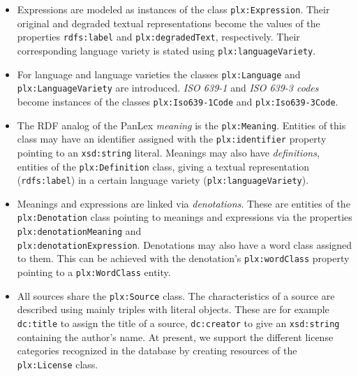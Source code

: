 \documentclass[sw]{iosart2c}
\begin{document}
\begin{itemize}
  \item Expressions are modeled as instances of the class \texttt{\small plx:Expression}.
    Their original and degraded textual representations become the values of the properties \texttt{\small rdfs:label} and \texttt{\small plx:degradedText}, respectively.
    Their corresponding language variety is stated using \texttt{\small plx:languageVariety}.
  \item For language and language varieties the classes \texttt{\small plx:Language} and \texttt{\small plx:LanguageVariety} are introduced.
    \emph{ISO 639-1} and \emph{ISO 639-3 codes} become instances of the classes \texttt{\small plx:Iso639-1Code} and \texttt{\small plx:Iso639-3Code}.
  \item The RDF analog of the PanLex \emph{meaning} is the \texttt{\small plx:Meaning}.
    Entities of this class may have an identifier assigned with the \texttt{\small plx:identifier} property pointing to an \texttt{\small xsd:string} literal.
    Meanings may also have \emph{definitions}, entities of the \texttt{\small plx:Definition} class, giving a textual representation (\texttt{\small rdfs:label}) in a certain language variety (\texttt{\small plx:languageVariety}).
  \item Meanings and expressions are linked via \emph{denotations}.
    These are entities of the \texttt{\small plx:Denotation} class pointing to meanings and expressions via the properties \texttt{\small plx:denotationMeaning} and \\ \texttt{\small plx:denotationExpression}.
    Denotations may also have a word class assigned to them.
    This can be achieved with the denotation's \texttt{\small plx:wordClass} property pointing to a \texttt{\small plx:WordClass} entity.
  \item All sources share the \texttt{\small plx:Source} class.
    The characteristics of a source are described using mainly triples with literal objects.
    These are for example \texttt{\small dc:title} to assign the title of a source, \texttt{\small dc:creator} to give an \texttt{\small xsd:string} containing the author's name. At present, we support the different license categories recognized in the database by creating resources of the \texttt{\small plx:License} class.
\end{itemize}
\end{document}
